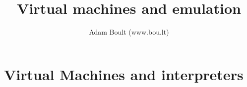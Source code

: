\documentclass[oneside]{book}
\begin{document}
\author{Adam Boult (www.bou.lt)}
\title{Virtual machines and emulation}
\maketitle

\setcounter{tocdepth}{0}
\tableofcontents



\part{Virtual Machines and interpreters}


\end{document}

